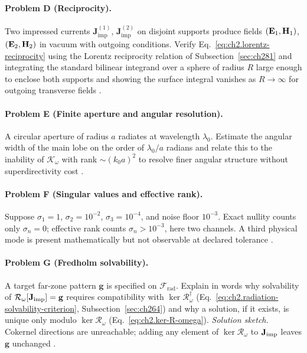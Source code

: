 \paragraph{Problem D (Reciprocity).}
Two impressed currents $\mathbf{J}^{(1)}_{\mathrm{imp}}$, $\mathbf{J}^{(2)}_{\mathrm{imp}}$ on disjoint supports produce fields $(\mathbf{E}_1,\mathbf{H}_1)$, $(\mathbf{E}_2,\mathbf{H}_2)$ in vacuum with outgoing conditions. Verify Eq.~\eqref{eq:ch2.lorentz-reciprocity} using the Lorentz reciprocity relation of Subsection~\ref{sec:ch281} and integrating the standard bilinear integrand over a sphere of radius $R$ large enough to enclose both supports and showing the surface integral vanishes as $R\to\infty$ for outgoing transverse fields \cite{stratton1941,jackson1999}.

\paragraph{Problem E (Finite aperture and angular resolution).}
A circular aperture of radius $a$ radiates at wavelength $\lambda_0$. Estimate the angular width of the main lobe on the order of $\lambda_0/a$ radians and relate this to the inability of $\mathcal{K}_\omega$ with rank $\sim(k_0 a)^2$ to resolve finer angular structure without superdirectivity cost \cite{chu1948,harrington2001}.

\paragraph{Problem F (Singular values and effective rank).}
Suppose $\sigma_1=1$, $\sigma_2=10^{-2}$, $\sigma_3=10^{-4}$, and noise floor $10^{-3}$. Exact nullity counts only $\sigma_n=0$; effective rank counts $\sigma_n>10^{-3}$, here two channels. A third physical mode is present mathematically but not observable at declared tolerance \cite{hansen1988,devaney2004}.

\paragraph{Problem G (Fredholm solvability).}
A target far-zone pattern $\mathbf{g}$ is specified on $\mathcal{F}_{\mathrm{rad}}$. Explain in words why solvability of $\mathcal{R}_\omega[\mathbf{J}_{\mathrm{imp}}]=\mathbf{g}$ requires compatibility with $\ker\mathcal{R}_\omega^{\dagger}$ (Eq.~\eqref{eq:ch2.radiation-solvability-criterion}, Subsection~\ref{sec:ch264}) and why a solution, if it exists, is unique only modulo $\ker\mathcal{R}_\omega$ (Eq.~\eqref{eq:ch2.ker-R-omega}). \emph{Solution sketch.} Cokernel directions are unreachable; adding any element of $\ker\mathcal{R}_\omega$ to $\mathbf{J}_{\mathrm{imp}}$ leaves $\mathbf{g}$ unchanged \cite{stratton1941,devaney2004}.
